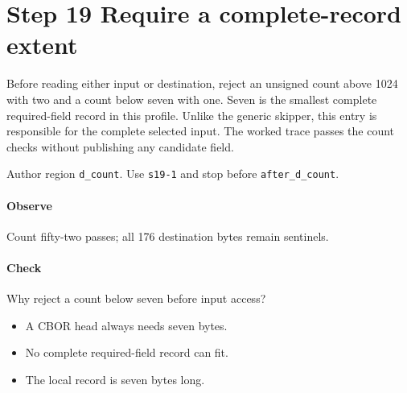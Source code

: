 \section{Step 19 Require a complete-record extent}\label{cbor-s19}
Before reading either input or destination, reject an unsigned count above 1024 with two and a count below seven with one. Seven is the smallest complete required-field record in this profile. Unlike the generic skipper, this entry is responsible for the complete selected input. The worked trace passes the count checks without publishing any candidate field.

Author region \texttt{d\_count}. Use \texttt{s19-1} and stop before \texttt{after\_d\_count}.

\paragraph{Observe} Count fifty-two passes; all 176 destination bytes remain sentinels.

\paragraph{Check} Why reject a count below seven before input access?
\begin{itemize}
  \item[A.] A CBOR head always needs seven bytes.
  \item[B.] No complete required-field record can fit.
  \item[C.] The local record is seven bytes long.
\end{itemize}
